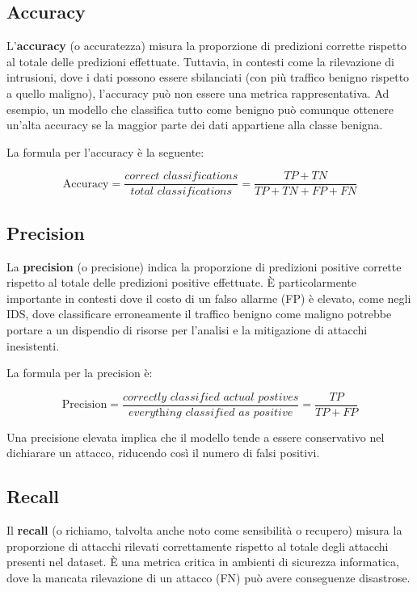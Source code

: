 \subsection{Accuracy}

L'\textbf{accuracy} (o accuratezza) misura la proporzione di predizioni corrette rispetto al totale delle predizioni effettuate. Tuttavia, in contesti come la rilevazione di intrusioni, dove i dati possono essere sbilanciati (con più traffico benigno rispetto a quello maligno), l'accuracy può non essere una metrica rappresentativa. Ad esempio, un modello che classifica tutto come benigno può comunque ottenere un'alta accuracy se la maggior parte dei dati appartiene alla classe benigna.

La formula per l'accuracy è la seguente:

\[
\text{Accuracy} = \frac{\textit{correct classifications}}{\textit{total classifications}}= \frac{TP + TN}{TP + TN + FP + FN}
\]

\subsection{Precision}

La \textbf{precision} (o precisione) indica la proporzione di predizioni positive corrette rispetto al totale delle predizioni positive effettuate. È particolarmente importante in contesti dove il costo di un falso allarme (FP) è elevato, come negli IDS, dove classificare erroneamente il traffico benigno come maligno potrebbe portare a un dispendio di risorse per l'analisi e la mitigazione di attacchi inesistenti.

La formula per la precision è:

\[
\text{Precision} =\frac{\textit{correctly classified actual postives}}{\textit{everything classified as positive}} = \frac{TP}{TP + FP}
\]

Una precisione elevata implica che il modello tende a essere conservativo nel dichiarare un attacco, riducendo così il numero di falsi positivi.

\subsection{Recall}

Il \textbf{recall} (o richiamo, talvolta anche noto come sensibilità o recupero) misura la proporzione di attacchi rilevati correttamente rispetto al totale degli attacchi presenti nel dataset. È una metrica critica in ambienti di sicurezza informatica, dove la mancata rilevazione di un attacco (FN) può avere conseguenze disastrose.

